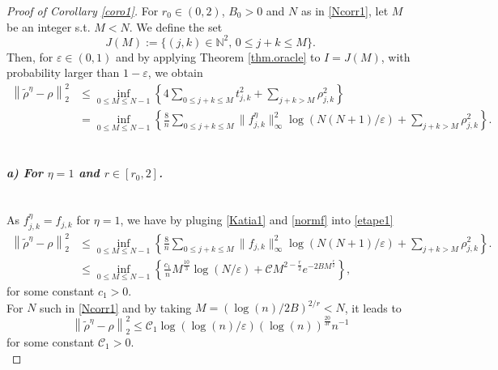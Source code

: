 \documentclass[a4paper]{amsart}
\begin{document}
\begin{proof}[Proof of Corollary \ref{coro1}]
For $r_{0}\in(0,2)$, $B_{0}>0$ and $N$ as in \eqref{Ncorr1}, let $M$ be an integer s.t. $M<N$. We define the set 
$$J(M) := \{(j,k)\in \mathbb{N}^2,\, 0\leq j+k\leq M\}.$$
 Then, for $\varepsilon\in (0,1)$ and by applying Theorem \ref{thm.oracle} to $I
= J(M)$, with probability larger than $1-\varepsilon$, we obtain
       \begin{align}
               \nonumber
                \left\|\tilde{\rho}^\eta - \rho \right\|^{2}_{2} 
                & \leq \inf_{0\leq M \leq N-1}\left\{ 4 \sum_{0\leq j+k\leq M}
t_{j,k}^{2} + \sum_{j+k> M}\rho_{j,k}^{2}  \right\} \\
                & = \inf_{0\leq M \leq N-1}\left\{ \frac{8}{n} \sum_{0\leq
j+k\leq M} \|f_{j,k}^\eta\|_{\infty}^{2}\log\left(N(N+1)/\varepsilon\right)+
\sum_{j+k> M}\rho_{j,k}^{2} \right\}.
             \label{etape1}
     \end{align}
 \noindent\\
     
\paragraph{\textit{a) For $\eta=1$ and $r\in[r_0,2]$.}}
\noindent\\

As  $ f_{j,k}^\eta=f_{j,k}$ for $\eta=1$, we have by pluging  \eqref{Katia1} and
\eqref{normf} into \eqref{etape1} 
       \begin{align}
               \nonumber
                \left\|\tilde{\rho}^\eta - \rho \right\|^{2}_{2} 
                & \leq \inf_{0\leq M \leq N-1}\left\{ \frac{8}{n} \sum_{0\leq
j+k\leq M} \|f_{j,k}\|_{\infty}^{2}\log\left(N(N+1)/\varepsilon\right)+
\sum_{j+k> M}\rho_{j,k}^{2} \right\}.
                 \nonumber\\
                 &\leq \inf_{0\leq M \leq N-1}\left\{\frac{c_1}{n}
M^{\frac{10}{3}}\log(N/\varepsilon)  + \mathcal{C} M^{2-\frac{r}{2}}
e^{-2BM^{\frac{r}{2}}} \right\},
 \label{etape2}
     \end{align}
for some constant $c_1>0$.\\
 For $N$ such in \eqref{Ncorr1} and by taking $M=(\log(n)/2B)^{2/r}<N$, it leads
to
$$
 \left\|\tilde{\rho}^\eta  - \rho \right\|^{2}_{2}  \leq\mathcal{C}_1 \log
\left(\log(n)/\varepsilon\right)
 \left(\log(n)\right)^{\frac{20}{3r}} n^{-1}
$$
for some constant $\mathcal{C}_{1}>0$.
\noindent\\ 



\end{proof}
\end{document}
